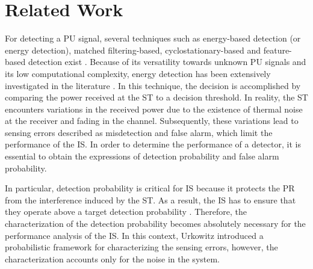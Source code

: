 \section{Related Work}



For detecting a PU signal, several techniques such as energy-based detection (or energy detection), matched filtering-based, cyclostationary-based and feature-based detection exist \cite{Sharma15, Axell12}. Because of its versatility towards unknown PU signals and its low computational complexity, energy detection has been extensively investigated in the literature \cite{Urkowitz, Kostylev02, Alouini03, Herath09, Mariani10}. In this technique, the decision is accomplished by comparing the power received at the ST to a decision threshold. In reality, the ST encounters variations in the received power due to the existence of thermal noise at the receiver and fading in the channel. Subsequently, these variations lead to sensing errors described as misdetection and false alarm, %
which limit the performance of the IS. In order to determine the performance of a detector, it is essential to obtain the expressions of detection probability and false alarm probability.

In particular, detection probability is critical for IS because it protects the PR from the interference induced by the ST. As a result, the IS has to ensure that they operate above a target detection probability \cite{peh07}. Therefore, the characterization of the detection probability becomes absolutely necessary for the performance analysis of the IS. In this context, Urkowitz \cite{Urkowitz} introduced a probabilistic framework for characterizing the sensing errors, however, the characterization accounts only for the noise in the system. 

